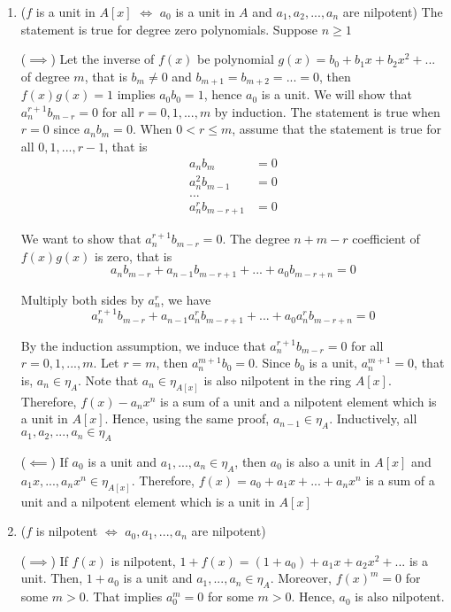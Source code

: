\begin{longproof}
	\begin{enumerate}
		\item ($f$ is a unit in $A[x]$ $\iff$ $a_0$ is a unit in $A$ and $a_1, a_2, ..., a_n$ are nilpotent) The statement is true for degree zero polynomials. Suppose $n \geq 1$
		
		($\implies$) Let the inverse of $f(x)$ be polynomial $g(x) = b_0 + b_1 x + b_2 x^2 + ...$ of degree $m$, that is $b_m \neq 0$ and $b_{m+1} = b_{m+2} = ... = 0$, then $f(x) g(x) = 1$ implies $a_0 b_0 = 1$, hence $a_0$ is a unit. We will show that $a_n^{r+1} b_{m-r} = 0$ for all $r=0, 1, ..., m$ by induction. The statement is true when $r=0$ since $a_n b_m = 0$. When $0 < r \leq m$, assume that the statement is true for all $0,1,..., r-1$, that is
		\begin{align*}
			a_n b_m &= 0 \\
			a_n^2 b_{m-1} &= 0 \\
			... \\
			a_n^r b_{m-r+1} &= 0
		\end{align*}
		
		We want to show that $a_n^{r+1} b_{m-r} = 0$. The degree $n+m-r$ coefficient of $f(x) g(x)$ is zero, that is
		$$
			a_n b_{m-r} + a_{n-1} b_{m-r+1} + ... + a_0 b_{m-r+n} = 0
		$$
		
		Multiply both sides by $a_n^r$, we have
		$$
			a_n^{r+1} b_{m-r} + a_{n-1} a_n^r b_{m-r+1} + ... + a_0 a_n^r b_{m-r+n} = 0
		$$
		
		By the induction assumption, we induce that $a_n^{r+1} b_{m-r} = 0$ for all $r=0,1,..., m$. Let $r = m$, then $a_n^{m+1} b_0 = 0$. Since $b_0$ is a unit, $a_n^{m+1} = 0$, that is, $a_n \in \eta_A$. Note that $a_n \in \eta_{A[x]}$ is also nilpotent in the ring $A[x]$. Therefore, $f(x) - a_n x^n$ is a sum of a unit and a nilpotent element which is a unit in $A[x]$. Hence, using the same proof, $a_{n-1} \in \eta_A$. Inductively, all $a_1, a_2, ..., a_n \in \eta_A$
		
		($\impliedby$) If $a_0$ is a unit and $a_1, ..., a_n \in \eta_A$, then $a_0$ is also a unit in $A[x]$ and $a_1 x, ..., a_n x^n \in \eta_{A[x]}$. Therefore, $f(x) = a_0 + a_1 x + ... + a_n x^n$ is a sum of a unit and a nilpotent element which is a unit in $A[x]$
 		
 		\item ($f$ is nilpotent $\iff$ $a_0, a_1, ..., a_n$ are nilpotent)
 		
 		
 		($\implies$) If $f(x)$ is nilpotent, $1 + f(x) = (1 + a_0) + a_1 x + a_2 x^2 + ...$ is a unit. Then, $1 + a_0$ is a unit and $a_1, ..., a_n \in \eta_A$. Moreover, $f(x)^m = 0$ for some $m > 0$. That implies $a_0^m = 0$ for some $m > 0$. Hence, $a_0$ is also nilpotent.
 		

\end{enumerate}
\end{longproof}
